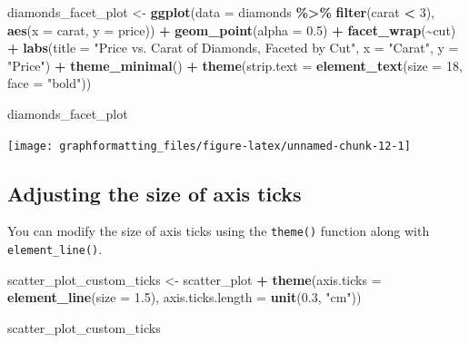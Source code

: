 \documentclass[
]{book}
\newenvironment{Shaded}{\begin{snugshade}}{\end{snugshade}}
\newcommand{\AttributeTok}[1]{\textcolor[rgb]{0.13,0.29,0.53}{#1}}
\newcommand{\DecValTok}[1]{\textcolor[rgb]{0.00,0.00,0.81}{#1}}
\newcommand{\FloatTok}[1]{\textcolor[rgb]{0.00,0.00,0.81}{#1}}
\newcommand{\FunctionTok}[1]{\textcolor[rgb]{0.13,0.29,0.53}{\textbf{#1}}}
\newcommand{\NormalTok}[1]{#1}
\newcommand{\OtherTok}[1]{\textcolor[rgb]{0.56,0.35,0.01}{#1}}
\newcommand{\SpecialCharTok}[1]{\textcolor[rgb]{0.81,0.36,0.00}{\textbf{#1}}}
\newcommand{\StringTok}[1]{\textcolor[rgb]{0.31,0.60,0.02}{#1}}
\begin{document}
\begin{Shaded}
\begin{Highlighting}[]
\NormalTok{diamonds\_facet\_plot }\OtherTok{\textless{}{-}} \FunctionTok{ggplot}\NormalTok{(}\AttributeTok{data =}\NormalTok{ diamonds }\SpecialCharTok{\%\textgreater{}\%} \FunctionTok{filter}\NormalTok{(carat }\SpecialCharTok{\textless{}} \DecValTok{3}\NormalTok{), }\FunctionTok{aes}\NormalTok{(}\AttributeTok{x =}\NormalTok{ carat, }\AttributeTok{y =}\NormalTok{ price)) }\SpecialCharTok{+}
\FunctionTok{geom\_point}\NormalTok{(}\AttributeTok{alpha =} \FloatTok{0.5}\NormalTok{) }\SpecialCharTok{+}
\FunctionTok{facet\_wrap}\NormalTok{(}\SpecialCharTok{\textasciitilde{}}\NormalTok{cut) }\SpecialCharTok{+}
\FunctionTok{labs}\NormalTok{(}\AttributeTok{title =} \StringTok{"Price vs. Carat of Diamonds, Faceted by Cut"}\NormalTok{,}
\AttributeTok{x =} \StringTok{"Carat"}\NormalTok{,}
\AttributeTok{y =} \StringTok{"Price"}\NormalTok{) }\SpecialCharTok{+}
\FunctionTok{theme\_minimal}\NormalTok{() }\SpecialCharTok{+}
\FunctionTok{theme}\NormalTok{(}\AttributeTok{strip.text =} \FunctionTok{element\_text}\NormalTok{(}\AttributeTok{size =} \DecValTok{18}\NormalTok{, }\AttributeTok{face =} \StringTok{"bold"}\NormalTok{))}

\NormalTok{diamonds\_facet\_plot}
\end{Highlighting}
\end{Shaded}

\texttt{[image: graphformatting\_files/figure-latex/unnamed-chunk-12-1]}

\hypertarget{adjusting-the-size-of-axis-ticks}{%
\subsection{Adjusting the size of axis ticks}\label{adjusting-the-size-of-axis-ticks}}

You can modify the size of axis ticks using the \texttt{theme()} function along with \texttt{element\_line()}.

\begin{Shaded}
\begin{Highlighting}[]
\NormalTok{scatter\_plot\_custom\_ticks }\OtherTok{\textless{}{-}}\NormalTok{ scatter\_plot }\SpecialCharTok{+}
  \FunctionTok{theme}\NormalTok{(}\AttributeTok{axis.ticks =} \FunctionTok{element\_line}\NormalTok{(}\AttributeTok{size =} \FloatTok{1.5}\NormalTok{),}
        \AttributeTok{axis.ticks.length =} \FunctionTok{unit}\NormalTok{(}\FloatTok{0.3}\NormalTok{, }\StringTok{"cm"}\NormalTok{))}

\NormalTok{scatter\_plot\_custom\_ticks}
\end{Highlighting}
\end{Shaded}
\end{document}
